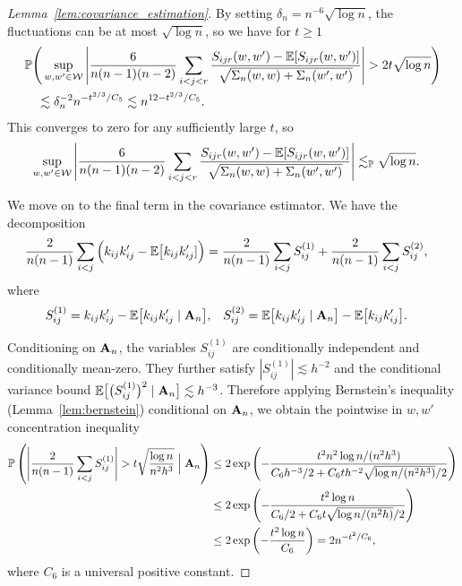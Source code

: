 \begin{proof}[Lemma~\ref{lem:covariance_estimation}]
  By setting
  $\delta_n = n^{-6} \sqrt{\log n}$,
  the fluctuations can be at most $\sqrt{\log n}$,
  so we have for $t \geq 1$
  \begin{align*}
    &\mathbb{P}\Bigg(
    \sup_{w, w' \in \mathcal{W}}
    \Bigg|
    \frac{6}{n(n-1)(n-2)}
    \sum_{i<j<r}
    \frac{S_{ijr}(w,w') - \mathbb{E}[S_{ijr}(w,w')]}
      {\sqrt{\Sigma_n(w,w) + \Sigma_n(w',w')}}
    \Bigg|
    > 2t \sqrt{\log n}
    \Bigg) \\
    &\quad\lesssim
    \delta_n^{-2}
    n^{-t^{2/3} / C_5}
    \lesssim
    n^{12-t^{2/3} / C_5}.
  \end{align*}
  This converges to zero for any sufficiently large $t$, so
  \begin{align*}
    \sup_{w, w' \in \mathcal{W}}
    \Bigg|
    \frac{6}{n(n-1)(n-2)}
    \sum_{i<j<r}
    \frac{S_{ijr}(w,w') - \mathbb{E}[S_{ijr}(w,w')]}
    {\sqrt{\Sigma_n(w,w) + \Sigma_n(w',w')}}
    \Bigg|
    &\lesssim_{\mathbb{P}}
    \sqrt{\log n}.
  \end{align*}


  We move on to the final term in
  the covariance estimator.
  We have the decomposition
  \begin{align*}
    \frac{2}{n(n-1)}
    \sum_{i<j}
    \Big(
    k_{ij} k_{ij}'
    - \mathbb{E}\big[k_{ij} k_{ij}']
    \Big)
    &=
    \frac{2}{n(n-1)}
    \sum_{i<j}
    S_{ij}^{(1)}
    +
    \frac{2}{n(n-1)}
    \sum_{i<j}
    S_{ij}^{(2)},
  \end{align*}
  where
  \begin{align*}
    S_{ij}^{(1)}
    &=
    k_{ij} k_{ij}'
    - \mathbb{E}\big[ k_{ij} k_{ij}' \mid \mathbf{A}_n \big],
    &S_{ij}^{(2)}
    &=
    \mathbb{E}\big[ k_{ij} k_{ij}' \mid \mathbf{A}_n \big]
    - \mathbb{E}\big[ k_{ij} k_{ij}' \big].
  \end{align*}


  Conditioning on $\mathbf{A}_n$,
  the variables $S_{ij}^{(1)}$
  are conditionally independent
  and conditionally mean-zero.
  They further satisfy
  $|S_{ij}^{(1)}| \lesssim h^{-2}$
  and the conditional variance bound
  $\mathbb{E}\big[\big( S_{ij}^{(1)} \big)^2 \mid \mathbf{A}_n \big] \lesssim h^{-3}$.
  Therefore applying Bernstein's inequality
  (Lemma~\ref{lem:bernstein})
  conditional on $\mathbf{A}_n$,
  we obtain the pointwise in $w,w'$
  concentration inequality
  \begin{align*}
    \mathbb{P}\left(
      \Bigg|
      \frac{2}{n(n-1)}
      \sum_{i<j}
      S_{ij}^{(1)}
      \Bigg|
      > t
      \sqrt{\frac{\log n}{n^2h^3}}
      \Bigm\vert \mathbf{A}_n
    \right)
    &\leq
    2 \exp\left(
      - \frac{t^2 n^2 \log n / (n^2h^3)}
      {C_6 h^{-3} / 2 + C_6 t h^{-2} \sqrt{\log n / (n^2h^3)} / 2}
    \right) \\
    &\leq
    2 \exp\left(
      - \frac{t^2 \log n}
      {C_6 / 2 + C_6 t \sqrt{\log n / (n^2h)} / 2}
    \right) \\
    &\leq
    2 \exp\left(
      - \frac{t^2 \log n}{C_6}
    \right)
    =
    2 n^{-t^2 / C_6},
  \end{align*}
  where $C_6$ is a universal positive constant.


\end{proof}
